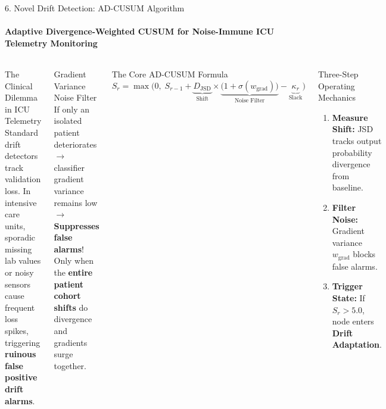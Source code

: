 \documentclass[aspectratio=169, 10pt]{beamer}
\begin{document}
\begin{frame}{6. Novel Drift Detection: AD-CUSUM Algorithm}
    \framesubtitle{Adaptive Divergence-Weighted CUSUM for Noise-Immune ICU Telemetry Monitoring}
    \begin{columns}[T]
        \begin{block}{The Clinical Dilemma in ICU Telemetry}
            \scriptsize
            Standard drift detectors track validation loss. In intensive care units, sporadic missing lab values or noisy sensors cause frequent loss spikes, triggering \textbf{ruinous false positive drift alarms}.
        \end{block}

        \begin{alertblock}{Gradient Variance Noise Filter}
            \scriptsize
            If only an isolated patient deteriorates $\rightarrow$ classifier gradient variance remains low $\rightarrow$ \textbf{Suppresses false alarms}! \\
            Only when the \textbf{entire patient cohort shifts} do divergence and gradients surge together.
        \end{alertblock}

        \begin{block}{The Core AD-CUSUM Formula}
            \centering
            \vspace{0.05cm}
            {\small
            $$S_r = \max\Big(0, \; S_{r-1} + \underbrace{D_{\text{JSD}}}_{\text{Shift}} \times \underbrace{\big(1 + \sigma(w_{\text{grad}})\big)}_{\text{Noise Filter}} - \underbrace{\kappa_r}_{\text{Slack}}\Big)$$
            }
            \vspace{0.05cm}
        \end{block}

        \begin{block}{Three-Step Operating Mechanics}
            \scriptsize
            \begin{enumerate}
                \setlength\itemsep{0.15em}
                \item \textbf{Measure Shift:} JSD tracks output probability divergence from baseline.
                \item \textbf{Filter Noise:} Gradient variance $w_{\text{grad}}$ blocks false alarms.
                \item \textbf{Trigger State:} If $S_r > 5.0$, node enters \textbf{Drift Adaptation}.
            \end{enumerate}
        \end{block}
    \end{columns}
\end{frame}
\end{document}
